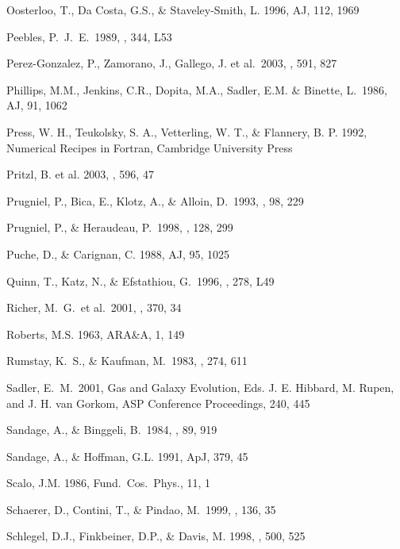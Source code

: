 \documentclass[12pt,preprint]{emulateapj}
\begin{document}
\begin{thebibliography}{}
Oosterloo, T., Da Costa, G.S., \& Staveley-Smith, L. 1996, AJ, 112, 1969

Peebles, P.~J.~E.\ 1989, \apjl, 344, L53 

Perez-Gonzalez, P., Zamorano, J., Gallego, J. et al.\ 2003, \apj, 591, 827 

Phillips, M.M., Jenkins, C.R., Dopita, M.A., Sadler, E.M. \& Binette, L.\ 1986, AJ, 91, 1062

Press, W. H., Teukolsky, S. A., Vetterling, W. T., \& Flannery, B. P. 1992,
Numerical Recipes in Fortran, Cambridge University Press

Pritzl, B. et al. 2003, \apj, 596, 47

Prugniel, P., Bica, E., Klotz, A., \& Alloin, D.\ 1993, \aaps, 98, 229 

Prugniel, P., \& Heraudeau, P.\ 1998, \aaps, 128, 299 

Puche, D., \& Carignan, C. 1988, AJ, 95, 1025

Quinn, T., Katz, N., \& Efstathiou, G.\ 1996, \mnras, 278, L49 

Richer, M.~G.~et al.\ 2001, \aap, 370, 34 

Roberts, M.S. 1963, ARA\&A, 1, 149

Rumstay, K.~S., \& Kaufman, M.\ 1983, \apj, 274, 611 

Sadler, E.~M.\ 2001, Gas and Galaxy Evolution, 
Eds. J. E. Hibbard, M. Rupen, and J. H. van Gorkom,
ASP Conference Proceedings, 240, 445 

Sandage, A., \& Binggeli, B.\ 1984, \aj, 89, 919

Sandage, A., \& Hoffman, G.L. 1991, ApJ, 379, 45

Scalo, J.M. 1986, Fund.\ Cos.\ Phys., 11, 1

Schaerer, D., Contini, T., \& Pindao, M.\ 1999, \aaps, 136, 35 

Schlegel, D.J., Finkbeiner, D.P., \& Davis, M. 1998, \apj , 500, 525


\end{thebibliography}
\end{document}

